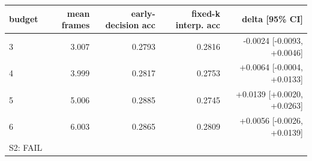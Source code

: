 \begin{tabular}{lrrrr}
\toprule
budget & mean frames & early-decision acc & fixed-k interp. acc & delta [95\% CI] \\
\midrule
3 & 3.007 & 0.2793 & 0.2816 & -0.0024 [-0.0093, +0.0046] \\
4 & 3.999 & 0.2817 & 0.2753 & +0.0064 [-0.0004, +0.0133] \\
5 & 5.006 & 0.2885 & 0.2745 & +0.0139 [+0.0020, +0.0263] \\
6 & 6.003 & 0.2865 & 0.2809 & +0.0056 [-0.0026, +0.0139] \\
\midrule
\multicolumn{5}{l}{S2: FAIL} \\
\bottomrule
\end{tabular}
